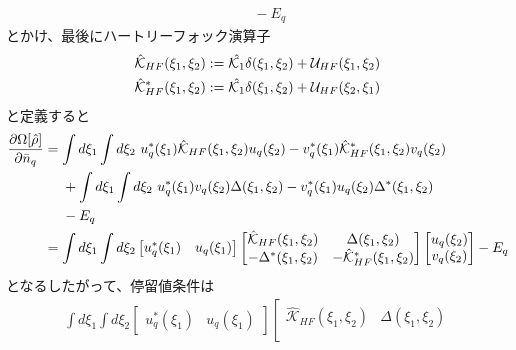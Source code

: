 \documentclass[dvipdfmx, 11pt, a4paper]{jsarticle}
\numberwithin{equation}{section}
\theoremstyle{definition}
\begin{document}
\begin{derivationBox}
\begin{align}
            &\ \ \ \ -E_q
        \end{align}
        とかけ、最後にハートリーフォック演算子
        \begin{align}
            &\hat{\mathcal{K}}_{HF}(\xi_1,\xi_2) := \hat{\mathcal{K}_1}\delta(\xi_1,\xi_2) + \mathcal{U}_{HF}(\xi_1,\xi_2) \notag \\
            &\hat{\mathcal{K}}_{HF}^*(\xi_1,\xi_2) := \hat{\mathcal{K}_1}\delta(\xi_1,\xi_2) + \mathcal{U}_{HF}(\xi_2,\xi_1)
        \end{align}
        と定義すると
        \begin{align}
            \frac{\partial \Omega[\hat{\rho}]}{\partial \bar{n}_q}&=\int d\xi_1\int d\xi_2\ u_{q}^*(\xi_1)\hat{\mathcal{K}}_{HF}(\xi_1,\xi_2) u_{q}(\xi_2)  -v_{q}^*(\xi_1) \hat{\mathcal{K}}_{HF}^*(\xi_1,\xi_2)  v_{q}(\xi_2) \notag \\
            &\ \ \ \ + \int d\xi_1 \int d\xi_2\   u_q^*(\xi_1) v_q(\xi_2)\Delta (\xi_1,\xi_2)   -    v^*_q(\xi_1)u_q(\xi_2)\Delta^* (\xi_1,\xi_2) \notag \\
            &\ \ \ \ -E_q \notag \\
            &= \int d\xi_1 \int d\xi_2 
            \left[
            \begin{matrix}
                u_q^*(\xi_1)&u_q(\xi_1)
            \end{matrix}
            \right]
            \left[
            \begin{matrix}
                \hat{\mathcal{K}}_{HF}(\xi_1,\xi_2)&\Delta(\xi_1,\xi_2)\\
                -\Delta^*(\xi_1,\xi_2)&-\hat{\mathcal{K}}_{HF}^*(\xi_1,\xi_2)
            \end{matrix}
            \right]
            \left[
            \begin{matrix}
                u_q(\xi_2)\\
                v_q(\xi_2)
            \end{matrix}
            \right] -E_q
        \end{align}
        となるしたがって、停留値条件は
        \begin{align}
            \int d\xi_1 \int d\xi_2 
            \left[
            \begin{matrix}
                u_q^*(\xi_1)&u_q(\xi_1)
            \end{matrix}
            \right]
            \left[
            \begin{matrix}
                \hat{\mathcal{K}}_{HF}(\xi_1,\xi_2)&\Delta(\xi_1,\xi_2)\\

\end{matrix}
\end{align}
\end{derivationBox}
\end{document}
